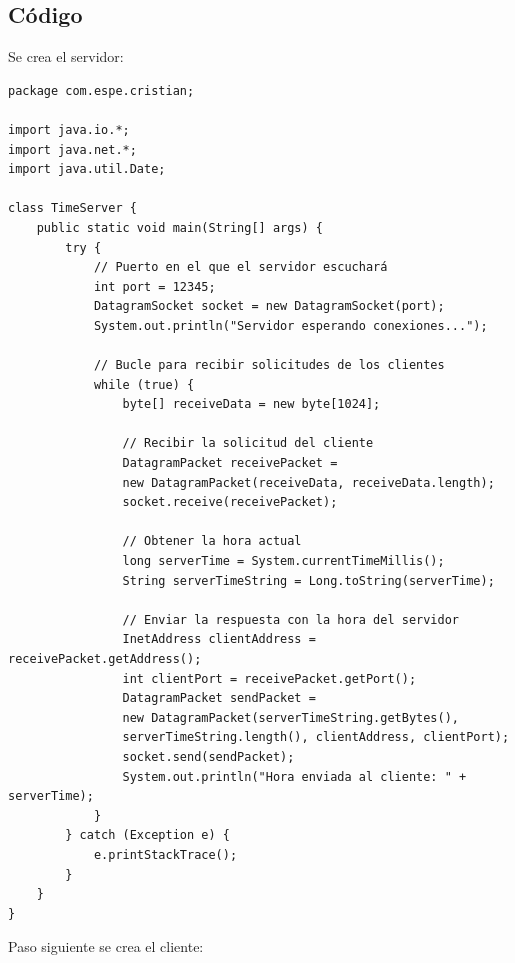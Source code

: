 \documentclass[a4paper,12pt]{report}
\begin{document}
\subsection{Código}
Se crea el servidor:
\begin{verbatim}
package com.espe.cristian;

import java.io.*;
import java.net.*;
import java.util.Date;

class TimeServer {
    public static void main(String[] args) {
        try {
            // Puerto en el que el servidor escuchará
            int port = 12345;
            DatagramSocket socket = new DatagramSocket(port);
            System.out.println("Servidor esperando conexiones...");

            // Bucle para recibir solicitudes de los clientes
            while (true) {
                byte[] receiveData = new byte[1024];

                // Recibir la solicitud del cliente
                DatagramPacket receivePacket = 
                new DatagramPacket(receiveData, receiveData.length);
                socket.receive(receivePacket);

                // Obtener la hora actual
                long serverTime = System.currentTimeMillis();
                String serverTimeString = Long.toString(serverTime);

                // Enviar la respuesta con la hora del servidor
                InetAddress clientAddress = receivePacket.getAddress();
                int clientPort = receivePacket.getPort();
                DatagramPacket sendPacket = 
                new DatagramPacket(serverTimeString.getBytes(),
                serverTimeString.length(), clientAddress, clientPort);
                socket.send(sendPacket);
                System.out.println("Hora enviada al cliente: " + serverTime);
            }
        } catch (Exception e) {
            e.printStackTrace();
        }
    }
}
\end{verbatim}
Paso siguiente se crea el cliente:
\end{document}
